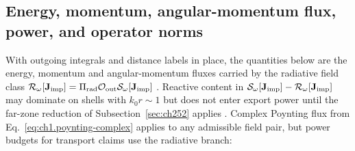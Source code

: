 \subsection{Energy, momentum, angular-momentum flux, power, and operator norms}
\label{sec:ch253}
With outgoing integrals and distance labels in place, the quantities below are the energy,
momentum and angular-momentum fluxes carried by the radiative field class
$\mathcal{R}_\omega[\mathbf{J}_{\mathrm{imp}}]=\Pi_{\mathrm{rad}}\mathcal{O}_{\mathrm{out}}\mathcal{S}_\omega[\mathbf{J}_{\mathrm{imp}}]$
\cite{poynting1884,stratton1941}. Reactive content in
$\mathcal{S}_\omega[\mathbf{J}_{\mathrm{imp}}]-\mathcal{R}_\omega[\mathbf{J}_{\mathrm{imp}}]$ may dominate on shells with
$k_0 r\sim1$ but does not enter export power until the far-zone reduction of
Subsection~\ref{sec:ch252} applies \cite{harrington2001}.
Complex Poynting flux from Eq.~\eqref{eq:ch1.poynting-complex} applies to any admissible
field pair, but power budgets for transport claims use the radiative branch:

